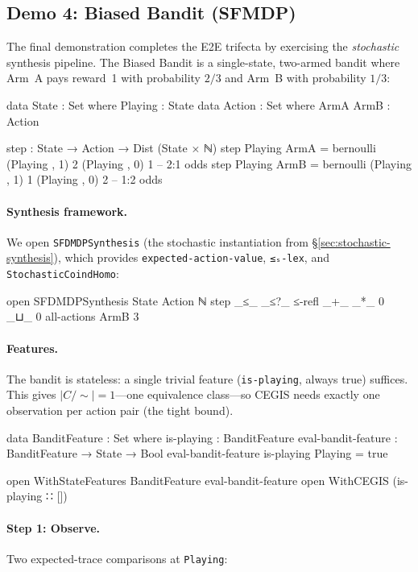 \documentclass[9pt,a4paper]{article}
\theoremstyle{plain}
\theoremstyle{definition}
\theoremstyle{remark}
\begin{document}
\subsection{Demo 4: Biased Bandit (SFMDP)}
\label{sec:e2e-bandit}

The final demonstration completes the E2E trifecta by exercising the \emph{stochastic} synthesis pipeline.
The Biased Bandit is a single-state, two-armed bandit where Arm~A pays reward~1 with probability $2/3$ and Arm~B with probability $1/3$:

\begin{spec}
data State : Set where  Playing : State
data Action : Set where  ArmA ArmB : Action

step : State → Action → Dist (State × ℕ)
step Playing ArmA = bernoulli (Playing , 1) 2 (Playing , 0) 1   -- 2:1 odds
step Playing ArmB = bernoulli (Playing , 1) 1 (Playing , 0) 2   -- 1:2 odds
\end{spec}

\paragraph{Synthesis framework.}  We open \texttt{SFDMDPSynthesis} (the stochastic instantiation from \S\ref{sec:stochastic-synthesis}), which provides \texttt{expected-action-value}, \texttt{≤ₛ-lex}, and \texttt{StochasticCoindHomo}:

\begin{spec}
open SFDMDPSynthesis State Action ℕ step _≤_ _≤?_ ≤-refl _+_ _*_ 0 _⊔_ 0
  all-actions ArmB 3
\end{spec}

\paragraph{Features.}  The bandit is stateless: a single trivial feature (\texttt{is-playing}, always true) suffices.  This gives $|C/{\sim}| = 1$---one equivalence class---so CEGIS needs exactly one observation per action pair (the tight bound).

\begin{spec}
data BanditFeature : Set where  is-playing : BanditFeature
eval-bandit-feature : BanditFeature → State → Bool
eval-bandit-feature is-playing Playing = true

open WithStateFeatures BanditFeature eval-bandit-feature
open WithCEGIS (is-playing ∷ [])
\end{spec}

\paragraph{Step 1: Observe.}  Two expected-trace comparisons at \texttt{Playing}:
\end{document}
